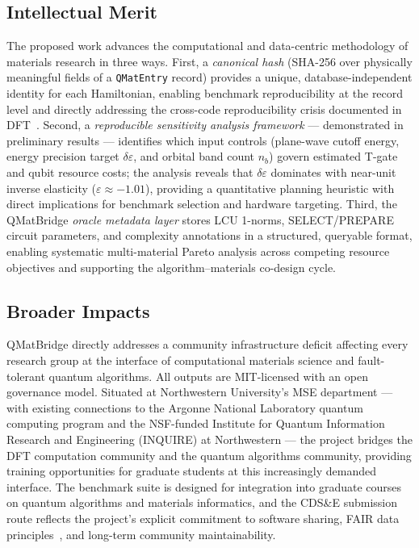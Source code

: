\documentclass[11pt]{article}
\newcommand{\de}{\delta\varepsilon}
\newcommand{\nb}{{n_b}}
\begin{document}
\subsection*{Intellectual Merit}

The proposed work advances the computational and data-centric methodology of
materials research in three ways.
First, a \emph{canonical hash} (SHA-256 over physically meaningful fields of
a \texttt{QMatEntry} record) provides a unique, database-independent identity
for each Hamiltonian, enabling benchmark reproducibility at the record level
and directly addressing the cross-code reproducibility crisis documented in
DFT~\cite{Lejaeghere2016}.
Second, a \emph{reproducible sensitivity analysis framework} --- demonstrated
in preliminary results --- identifies which input controls (plane-wave cutoff
energy, energy precision target $\de$, and orbital band count $\nb$) govern
estimated T-gate and qubit resource costs; the analysis reveals that $\de$
dominates with near-unit inverse elasticity ($\varepsilon \approx -1.01$),
providing a quantitative planning heuristic with direct implications for
benchmark selection and hardware targeting.
Third, the QMatBridge \emph{oracle metadata layer} stores LCU 1-norms,
SELECT/PREPARE circuit parameters, and complexity annotations in a
structured, queryable format, enabling systematic multi-material Pareto
analysis across competing resource objectives and supporting the
algorithm--materials co-design cycle.

\subsection*{Broader Impacts}

QMatBridge directly addresses a community infrastructure deficit affecting
every research group at the interface of computational materials science and
fault-tolerant quantum algorithms.
All outputs are MIT-licensed with an open governance model.
Situated at Northwestern University's MSE department --- with existing
connections to the Argonne National Laboratory quantum computing program and
the NSF-funded Institute for Quantum Information Research and Engineering
(INQUIRE) at Northwestern --- the project bridges the DFT computation
community and the quantum algorithms community, providing training
opportunities for graduate students at this increasingly demanded interface.
The benchmark suite is designed for integration into graduate courses on
quantum algorithms and materials informatics, and the CDS\&E submission
route reflects the project's explicit commitment to software sharing,
FAIR data principles~\cite{Wilkinson2016}, and long-term community
maintainability.
\end{document}
